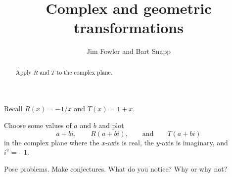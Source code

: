 \documentclass{ximera}
\title{Complex and geometric transformations}
\author{Jim Fowler and Bart Snapp}
\begin{document}
\begin{abstract}
  Apply $R$ and $T$ to the complex plane.
\end{abstract}

\maketitle

Recall $R(x) = -1/x$ and $T(x) = 1+x$.   

\begin{question}
  Choose some values of $a$ and $b$ and plot
  \[
  a+bi, \qquad R(a+bi),\qquad\text{and}\qquad T(a+bi)
  \]
  in the complex plane where the $x$-axis is real, the $y$-axis is
  imaginary, and $i^2=-1$.

  \begin{freeResponse}
  \end{freeResponse}
\end{question}

\begin{question}
  Pose problems.  Make conjectures.  What do you notice?  Why or why not?

  \begin{freeResponse}
  \end{freeResponse}
\end{question}
\end{document}
